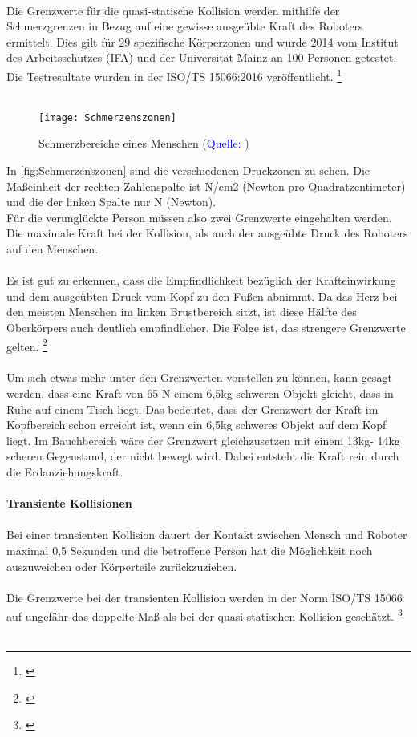 \documentclass[titlepage,12pt,twoside]{article}
\begin{document}
\\
Die Grenzwerte für die quasi-statische Kollision werden mithilfe der 
Schmerzgrenzen in Bezug auf eine gewisse ausgeübte Kraft des Roboters ermittelt. 
Dies gilt für 29 spezifische Körperzonen und wurde 2014 vom Institut des 
Arbeitsschutzes (IFA) und der Universität Mainz an 100 Personen getestet. Die 
Testresultate wurden in der ISO/TS 15066:2016 veröffentlicht. \footnote{\cite{Frauenhofer17}} \\
\\
\begin{figure}[H]
	\begin{center}
		\scalebox{0.5}
		{\texttt{[image: Schmerzenszonen]}}
		\caption{Schmerzbereiche eines Menschen (\textcolor{blue}{Quelle: \cite{Frauenhofer18}})}
		\label{fig:Schmerzenszonen}
	\end{center}
\end{figure}
\hfill \break
In \autoref{fig:Schmerzenszonen} sind die verschiedenen Druckzonen zu sehen. Die 
Maßeinheit der rechten Zahlenspalte ist N/cm2 (Newton pro Quadratzentimeter) und 
die der linken Spalte nur N (Newton). \\
Für die verunglückte Person müssen also zwei Grenzwerte eingehalten werden. Die 
maximale Kraft bei der Kollision, als auch der ausgeübte Druck des Roboters auf 
den Menschen. \\
\\
Es ist gut zu erkennen, dass die Empfindlichkeit bezüglich der Krafteinwirkung 
und dem ausgeübten Druck vom Kopf zu den Füßen abnimmt. Da das Herz bei den 
meisten Menschen im linken Brustbereich sitzt, ist diese Hälfte des Oberkörpers 
auch deutlich empfindlicher. Die Folge ist, das strengere Grenzwerte gelten. \footnote{\cite{Frauenhofer18}} \\
\\
Um sich etwas mehr unter den Grenzwerten vorstellen zu können, kann gesagt werden, 
dass eine Kraft von 65 N einem 6,5kg schweren Objekt gleicht, dass in Ruhe auf 
einem Tisch liegt. Das bedeutet, dass der Grenzwert der Kraft im Kopfbereich 
schon erreicht ist, wenn ein 6,5kg schweres Objekt auf dem Kopf liegt. Im 
Bauchbereich wäre der Grenzwert gleichzusetzen mit einem 13kg- 14kg scheren 
Gegenstand, der nicht bewegt wird. Dabei entsteht die Kraft rein durch die 
Erdanziehungskraft. \\
\\
\textbf{Transiente Kollisionen} \\
\\
Bei einer transienten Kollision dauert der Kontakt zwischen Mensch und Roboter 
maximal 0,5 Sekunden und die betroffene Person hat die Möglichkeit noch 
auszuweichen oder Körperteile zurückzuziehen. \\
\\
Die Grenzwerte bei der transienten Kollision werden in der Norm ISO/TS 15066 auf 
ungefähr das doppelte Maß als bei der quasi-statischen Kollision geschätzt. \footnote{\cite{Frauenhofer17}} \\
\\
\end{document}
